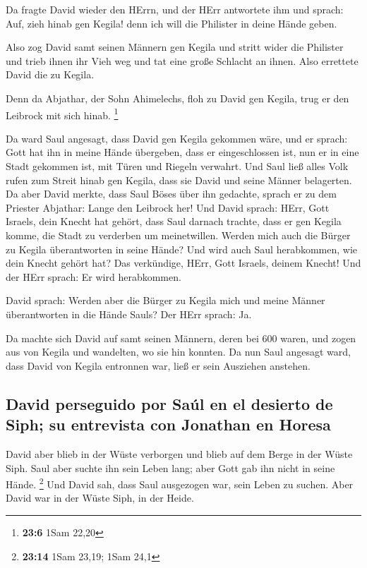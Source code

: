  Da fragte David wieder den HErrn, und der HErr antwortete
ihm und sprach: Auf, zieh hinab gen Kegila! denn ich will die Philister
in deine Hände geben.

 Also zog David samt seinen Männern gen Kegila und stritt
wider die Philister und trieb ihnen ihr Vieh weg und tat eine große
Schlacht an ihnen. Also errettete David die zu Kegila.

 Denn da Abjathar, der Sohn Ahimelechs, floh zu David gen
Kegila, trug er den Leibrock mit sich hinab. \footnote{\textbf{23:6}
  1Sam 22,20}

 Da ward Saul angesagt, dass David gen Kegila gekommen
wäre, und er sprach: Gott hat ihn in meine Hände übergeben, dass er
eingeschlossen ist, nun er in eine Stadt gekommen ist, mit Türen und
Riegeln verwahrt.  Und Saul ließ alles Volk rufen zum
Streit hinab gen Kegila, dass sie David und seine Männer belagerten.
 Da aber David merkte, dass Saul Böses über ihn gedachte,
sprach er zu dem Priester Abjathar: Lange den Leibrock her!
 Und David sprach: HErr, Gott Israels, dein Knecht hat
gehört, dass Saul darnach trachte, dass er gen Kegila komme, die Stadt
zu verderben um meinetwillen.  Werden mich auch die
Bürger zu Kegila überantworten in seine Hände? Und wird auch Saul
herabkommen, wie dein Knecht gehört hat? Das verkündige, HErr, Gott
Israels, deinem Knecht! Und der HErr sprach: Er wird herabkommen.

 David sprach: Werden aber die Bürger zu Kegila mich und
meine Männer überantworten in die Hände Sauls? Der HErr sprach: Ja.

 Da machte sich David auf samt seinen Männern, deren bei
600 waren, und zogen aus von Kegila und wandelten, wo sie hin konnten.
Da nun Saul angesagt ward, dass David von Kegila entronnen war, ließ er
sein Ausziehen anstehen.

\hypertarget{david-perseguido-por-sauxfal-en-el-desierto-de-siph-su-entrevista-con-jonathan-en-horesa}{%
\subsection{David perseguido por Saúl en el desierto de Siph; su
entrevista con Jonathan en
Horesa}\label{david-perseguido-por-sauxfal-en-el-desierto-de-siph-su-entrevista-con-jonathan-en-horesa}}

 David aber blieb in der Wüste verborgen und blieb auf
dem Berge in der Wüste Siph. Saul aber suchte ihn sein Leben lang; aber
Gott gab ihn nicht in seine Hände. \footnote{\textbf{23:14} 1Sam 23,19;
  1Sam 24,1}  Und David sah, dass Saul ausgezogen war,
sein Leben zu suchen. Aber David war in der Wüste Siph, in der Heide.

